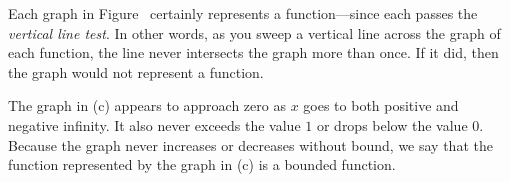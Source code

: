 
  Each graph in
Figure~
certainly represents a function---since each passes the {\em vertical
line test}.  In other words, as you sweep a vertical line across the graph
of each function, the line never intersects the graph more than once.  If
it did, then the graph would not represent a function.

 The graph in (c) appears to approach zero as $x$ goes
to both positive and negative infinity.  It also never exceeds the value
$1$ or drops below the value $0$.  Because the graph never increases or
decreases without bound, we say that the function represented by the graph
in (c) is a {\dfont bounded} 
function.  

